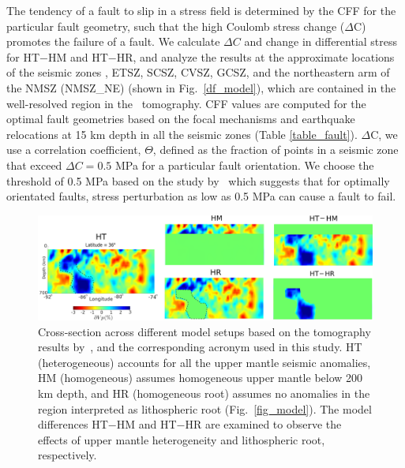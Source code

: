 \documentclass[draft,linenumbers]{agujournal2018}
\begin{document}
The tendency of a fault to slip in a stress field is determined by the CFF for the particular fault geometry, such that the high Coulomb stress change ($\Delta$C) promotes the failure of a fault. We calculate $\Delta C$ and change in differential stress for HT$-$HM and HT$-$HR, and analyze the results at the approximate locations of the seismic zones , ETSZ, SCSZ, CVSZ, GCSZ, and the northeastern arm of the NMSZ (NMSZ\_NE) (shown in Fig.~\ref{df_model}), which are contained in the well-resolved region in the~\citet{Biryol_2016} tomography. CFF values are computed for the optimal fault geometries based on the focal mechanisms and earthquake relocations at 15 km depth in all the seismic zones (Table \ref{table_fault}).  $\Delta$C, we use a correlation coefficient, $\Theta$, defined as the fraction of points in a seismic zone that exceed $\Delta C = 0.5$ MPa for a particular fault orientation. We choose the threshold of 0.5 MPa based on the study by~\citet{stein1999role} which suggests that for optimally orientated faults, stress perturbation as low as 0.5 MPa can cause a fault to fail.
%
\begin{figure}[h!]
    \centering
    \includegraphics[width=\linewidth]{figures/model_differences.png}
    \caption{Cross-section across different model setups based on the tomography results by~\citep{Biryol_2016}, and the corresponding acronym used in this study. HT (heterogeneous) accounts for all the upper mantle seismic anomalies, HM (homogeneous) assumes homogeneous upper mantle below 200 km depth, and HR (homogeneous root) assumes no anomalies in the region interpreted as lithospheric root (Fig.~\ref{fig_model}). The model differences HT$-$HM and HT$-$HR are examined to observe the effects of upper mantle heterogeneity and lithospheric root, respectively.}
    \label{model_differences}
\end{figure}
%
\end{document}
